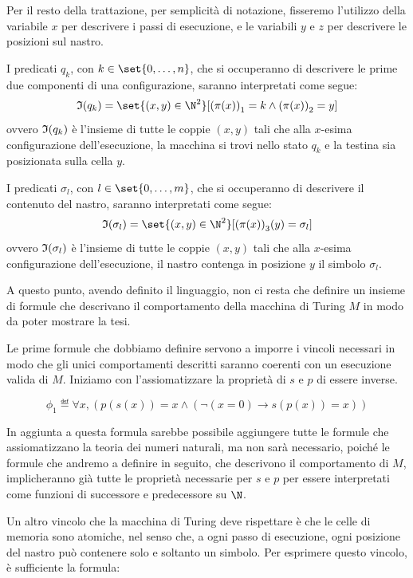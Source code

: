 Per il resto della trattazione, per semplicità di notazione, fisseremo l'utilizzo della variabile \(x\) per descrivere i passi di esecuzione, e le variabili \(y\) e \(z\) per descrivere le posizioni sul nastro.

I predicati \(q_k\), con \(k \in \set{0,\ldots,n}\), che si occuperanno di descrivere le prime due componenti di una configurazione, saranno interpretati come segue:
\[\Interp(q_k) = \set{(x,y)\in\N^2}[{(\pi(x))}_1 = k \land {(\pi(x))}_2 = y ]\]
ovvero \(\mathfrak{I}(q_k)\) è l'insieme di tutte le coppie \((x,y)\) tali che alla \(x\)-esima configurazione dell'esecuzione, la macchina si trovi nello stato \(q_k\) e la testina sia posizionata sulla cella \(y\).

I predicati \(\sigma_l\), con \(l \in \set{0,\ldots,m}\), che si occuperanno di descrivere il contenuto del nastro, saranno interpretati come segue:
\[\Interp(\sigma_l) = \set{(x,y)\in\N^2}[{(\pi(x))}_3(y) = \sigma_l] \]
ovvero \(\mathfrak{I}(\sigma_l)\) è l'insieme di tutte le coppie \((x,y)\) tali che alla \(x\)-esima configurazione dell'esecuzione, il nastro contenga in posizione \(y\) il simbolo \(\sigma_l\).

A questo punto, avendo definito il linguaggio, non ci resta che definire un insieme di formule che descrivano il comportamento della macchina di Turing \(M\) in modo da poter mostrare la tesi.

Le prime formule che dobbiamo definire servono a imporre i vincoli necessari in modo che gli unici comportamenti descritti saranno coerenti con un esecuzione valida di \(M\). Iniziamo con l'assiomatizzare la proprietà di \(s\) e \(p\) di essere inverse.

\begin{equation}
  \phi_1 \eqdef \forall x, (p(s(x)) = x \land (\neg(x = 0) \to s(p(x)) = x))
\end{equation}

In aggiunta a questa formula sarebbe possibile aggiungere tutte le formule che assiomatizzano la teoria dei numeri naturali, ma non sarà necessario, poiché le formule che andremo a definire in seguito, che descrivono il comportamento di \(M\), implicheranno già tutte le proprietà necessarie per \(s\) e \(p\) per essere interpretati come funzioni di successore e predecessore su \(\N\).

Un altro vincolo che la macchina di Turing deve rispettare è che le celle di memoria sono atomiche, nel senso che, a ogni passo di esecuzione, ogni posizione del nastro può contenere solo e soltanto un simbolo. Per esprimere questo vincolo, è sufficiente la formula:

